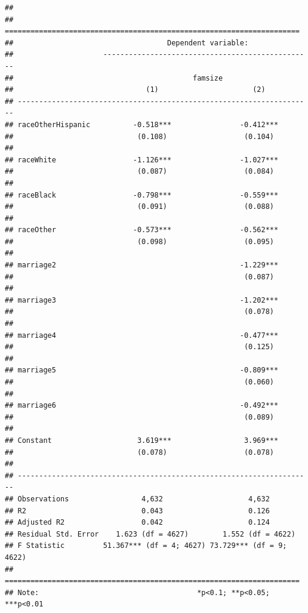 \documentclass[]{tufte-book}
\theoremstyle{definition}
\theoremstyle{definition}
\theoremstyle{remark}
\begin{document}
\begin{verbatim}
## 
## =====================================================================
##                                    Dependent variable:               
##                     -------------------------------------------------
##                                          famsize                     
##                               (1)                      (2)           
## ---------------------------------------------------------------------
## raceOtherHispanic          -0.518***                -0.412***        
##                             (0.108)                  (0.104)         
##                                                                      
## raceWhite                  -1.126***                -1.027***        
##                             (0.087)                  (0.084)         
##                                                                      
## raceBlack                  -0.798***                -0.559***        
##                             (0.091)                  (0.088)         
##                                                                      
## raceOther                  -0.573***                -0.562***        
##                             (0.098)                  (0.095)         
##                                                                      
## marriage2                                           -1.229***        
##                                                      (0.087)         
##                                                                      
## marriage3                                           -1.202***        
##                                                      (0.078)         
##                                                                      
## marriage4                                           -0.477***        
##                                                      (0.125)         
##                                                                      
## marriage5                                           -0.809***        
##                                                      (0.060)         
##                                                                      
## marriage6                                           -0.492***        
##                                                      (0.089)         
##                                                                      
## Constant                    3.619***                 3.969***        
##                             (0.078)                  (0.078)         
##                                                                      
## ---------------------------------------------------------------------
## Observations                 4,632                    4,632          
## R2                           0.043                    0.126          
## Adjusted R2                  0.042                    0.124          
## Residual Std. Error    1.623 (df = 4627)        1.552 (df = 4622)    
## F Statistic         51.367*** (df = 4; 4627) 73.729*** (df = 9; 4622)
## =====================================================================
## Note:                                     *p<0.1; **p<0.05; ***p<0.01
\end{verbatim}
\end{document}
